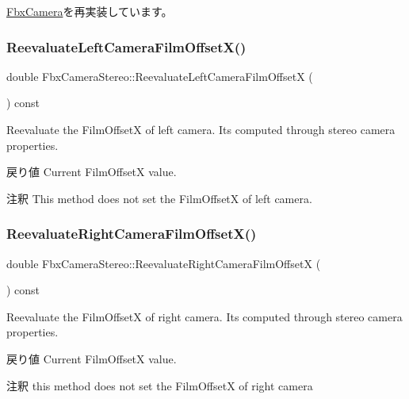 \hyperlink{class_fbx_camera_ac52d0e82cbabac69f8b0dcd212853616}{Fbx\+Camera}を再実装しています。

\mbox{\label{class_fbx_camera_stereo_a372e001c8d6f950d787831dc57c5fc20}} 
\subsubsection{\texorpdfstring{Reevaluate\+Left\+Camera\+Film\+Offset\+X()}{ReevaluateLeftCameraFilmOffsetX()}}
{\footnotesize\ttfamily double Fbx\+Camera\+Stereo\+::\+Reevaluate\+Left\+Camera\+Film\+OffsetX (\begin{DoxyParamCaption}{ }\end{DoxyParamCaption}) const}

Reevaluate the Film\+OffsetX of left camera. It\textquotesingle{}s computed through stereo camera properties. \begin{DoxyReturn}{戻り値}
Current Film\+OffsetX value. 
\end{DoxyReturn}
\begin{DoxyRemark}{注釈}
This method does not set the Film\+OffsetX of left camera. 
\end{DoxyRemark}
\mbox{\label{class_fbx_camera_stereo_a63526f13544a343e4447d4567a88bf9d}} 
\subsubsection{\texorpdfstring{Reevaluate\+Right\+Camera\+Film\+Offset\+X()}{ReevaluateRightCameraFilmOffsetX()}}
{\footnotesize\ttfamily double Fbx\+Camera\+Stereo\+::\+Reevaluate\+Right\+Camera\+Film\+OffsetX (\begin{DoxyParamCaption}{ }\end{DoxyParamCaption}) const}

Reevaluate the Film\+OffsetX of right camera. It\textquotesingle{}s computed through stereo camera properties. \begin{DoxyReturn}{戻り値}
Current Film\+OffsetX value. 
\end{DoxyReturn}
\begin{DoxyRemark}{注釈}
this method does not set the Film\+OffsetX of right camera 
\end{DoxyRemark}
\mbox{\label{class_fbx_camera_stereo_a5c693025d4b4d25ea05bec61f2c25cd8}} 
